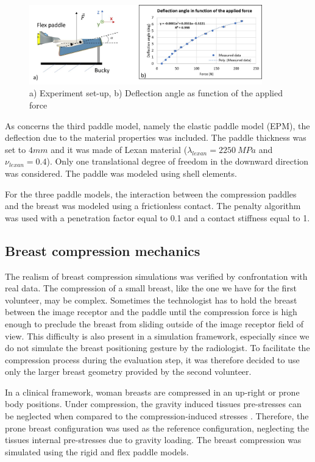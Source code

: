 \begin{figure}[!h]
\centering
\includegraphics[width=0.9\textwidth,keepaspectratio]{figures/deflectionAngle.jpg} 
\caption{ a) Experiment set-up, b) Deflection angle as function of the applied force }\label{fig:deflectionangle}
\end{figure}

As concerns the third paddle model, namely the elastic paddle model (EPM), the deflection due to the material properties was included. The paddle thickness was set to $4mm$ and it was made of Lexan material ($\lambda_{lexan}= 2250 \ MPa$ and $\nu_{lexan}= 0.4$).   Only one translational degree of freedom in the downward direction was considered. The paddle was modeled using shell elements. 

For the three paddle models, the interaction between the compression paddles and the breast was modeled using a frictionless contact. The penalty algorithm was used with a penetration factor equal to 0.1 and a contact stiffness equal to 1. 
 
\subsection{Breast compression mechanics}

The realism of breast compression simulations was verified by confrontation with real data. The compression of a small breast, like the one we have for the first volunteer, may be complex. Sometimes the technologist has to hold the breast between the image receptor and the paddle until the compression force is high enough to preclude the breast from sliding outside of the image receptor field of view. This difficulty is also present in a simulation framework, especially since we do not simulate the breast positioning gesture by the radiologist. To facilitate the compression process during the evaluation step, it was therefore decided to use only the larger breast geometry  provided by the second volunteer.

In a clinical framework, woman breasts are compressed in an up-right or prone body positions. Under compression, the gravity induced tissues pre-stresses can be neglected when compared to the compression-induced stresses \citep{han_development_2012, ruiter_model_based_2006, sturgeon_finite_element_2016}.  Therefore, the prone breast configuration was used as the reference configuration, neglecting the tissues internal pre-stresses due to gravity loading. The breast compression was simulated using the rigid and flex paddle models. 

